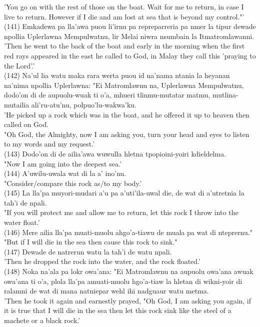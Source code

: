 \documentclass[10pt]{article}
\begin{document}
'You go on with the rest of those on the boat. Wait for me to return, in case I live to return. However if I die and am lost at sea that is beyond my control."'\\
(141) Emkadewa pa lla'awa puou li'irnu pa repreparreria pa nmer la tipur dewade npollia Uplerlawna Mempulwatnu, lir Melai niwra nsumbain la Itmatromlawanni.\\
'Then he went to the back of the boat and early in the morning when the first red rays appeared in the east he called to God, in Malay they call this 'praying to the Lord'.'\\
(142) Na'ul lia watu maka rara werta puou id na'nama ntania la heyanan na'nima npollia Uplerlawna: "Ei Matromlawnu na, Uplerlawna Mempulwatnu, dodo'on di de aupuolu-wuak ti o'a, mhueri tlinmu-mutatar matmu, mutlina-mutailia ali'ru-atu'nu, polpuo'lu-wakwa'ku.\\
'He picked up a rock which was in the boat, and he offered it up to heaven then called on God.\\
"Oh God, the Almighty, now I am asking you, turn your head and eyes to listen to my words and my request.'\\
(143) Dodo'on di de ailia'awa wuwulla hletna tpopioini-yoiri kdieldelma.\\
"Now I am going into the deepest sea.'\\
(144) A'uwilu-uwala wat di la a' ino'nu.\\
"Consider/compare this rock as/to my body.'\\
(145) La lla'pa muyori-mudari a'u pa a'uti'ila-uwal die, de wat di a'utretnia la tah'i de npali.\\
"If you will protect me and allow me to return, let this rock I throw into the water float.'\\
(146) Mere ailia lla'pa muati-muolu ahgo'a-tiawu de muala pa wat di nteprernu."\\
"But if I will die in the sea then cause this rock to sink."\\
(147) Dewade de natrerun watu la tah'i de watu npali.\\
'Then he dropped the rock into the water, and the rock floated.'\\
(148) Noka na'ala pa lokr owa'ana: "Ei Matromlawnu na aupuolu owa'ana awuak owa'ana ti o'a, plola lla'pa amuati-muolu hgo'a-tiaw la hletan di wikni-yoir di ralamni de wat di mana natniepar wehl ihi nadguaur watu metma.\\
'Then he took it again and earnestly prayed, "Oh God, I am asking you again, if it is true that I will die in the sea then let this rock sink like the steel of a machete or a black rock.'\\
\end{document}
